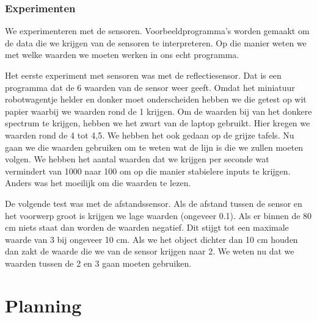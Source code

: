 \documentclass[a4paper,twoside,kulak]{kulakreport} %
\begin{document}
\subsubsection{Experimenten}

We experimenteren met de sensoren. Voorbeeldprogramma's worden gemaakt om de data die we krijgen van de sensoren te interpreteren. Op die manier weten we met welke waarden we moeten werken in ons echt programma. 

Het eerste experiment met sensoren was met de reflectiesensor. Dat is een programma dat de 6 waarden van de sensor weer geeft. Omdat het miniatuur robotwagentje helder en donker moet onderscheiden hebben we die getest op wit papier waarbij we waarden rond de 1 krijgen. Om de waarden bij van het donkere spectrum te krijgen, hebben we het zwart van de laptop gebruikt. Hier kregen we waarden rond de 4 tot 4,5. We hebben het ook gedaan op de grijze tafels.
Nu gaan we die waarden gebruiken om te weten wat de lijn is die we zullen moeten volgen.
We hebben het aantal waarden dat we krijgen per seconde wat vermindert van 1000 naar 100 om op die manier stabielere inputs te krijgen. Anders was het moeilijk om die waarden te lezen.


De volgende test was met de afstandssensor. Als de afstand tussen de sensor en het voorwerp groot is krijgen we lage waarden (ongeveer 0.1). Als er binnen de 80 cm niets staat dan worden de waarden negatief. Dit stijgt tot een maximale waarde van 3 bij ongeveer 10 cm. Als we het object dichter dan 10 cm houden dan zakt de waarde die we van de sensor krijgen naar 2. We weten nu dat we waarden tussen de 2 en 3 gaan moeten gebruiken. 

\section{Planning}



\end{document}
